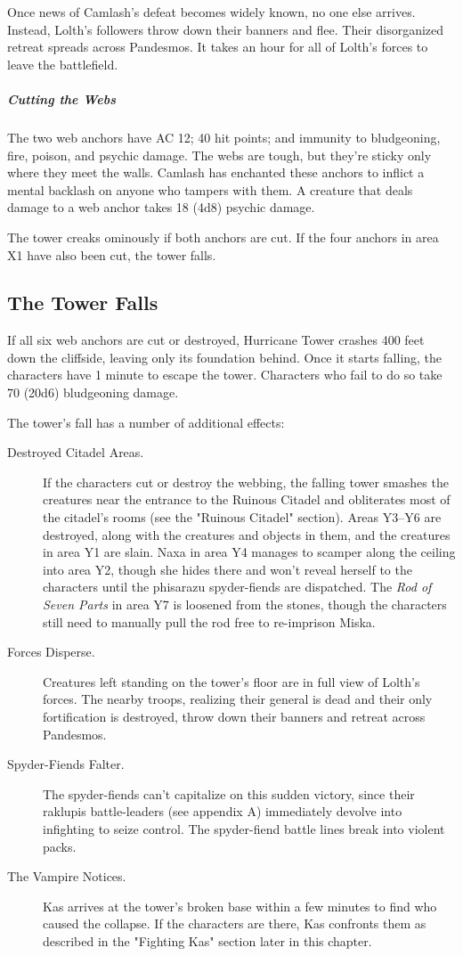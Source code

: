 \documentclass[10pt,a4paper,twoside,bg=print,twocolumn,openany,nodeprecatedcode]{dndbook}
\begin{document}
Once news of Camlash's defeat becomes widely known, no one else arrives. Instead, Lolth's followers throw down their banners and flee. Their disorganized retreat spreads across Pandesmos. It takes an hour for all of Lolth's forces to leave the battlefield.

\subparagraph{Cutting the Webs}
The two web anchors have AC 12; 40 hit points; and immunity to bludgeoning, fire, poison, and psychic damage. The webs are tough, but they're sticky only where they meet the walls. Camlash has enchanted these anchors to inflict a mental backlash on anyone who tampers with them. A creature that deals damage to a web anchor takes 18 (4d8) psychic damage.

The tower creaks ominously if both anchors are cut. If the four anchors in area X1 have also been cut, the tower falls.

\subsection{The Tower Falls}
If all six web anchors are cut or destroyed, Hurricane Tower crashes 400 feet down the cliffside, leaving only its foundation behind. Once it starts falling, the characters have 1 minute to escape the tower. Characters who fail to do so take 70 (20d6) bludgeoning damage.

The tower's fall has a number of additional effects:


\begin{description}
\item[Destroyed Citadel Areas.]
If the characters cut or destroy the webbing, the falling tower smashes the creatures near the entrance to the Ruinous Citadel and obliterates most of the citadel's rooms (see the "Ruinous Citadel" section). Areas Y3–Y6 are destroyed, along with the creatures and objects in them, and the creatures in area Y1 are slain. Naxa in area Y4 manages to scamper along the ceiling into area Y2, though she hides there and won't reveal herself to the characters until the phisarazu spyder-fiends are dispatched. The \textit{Rod of Seven Parts} in area Y7 is loosened from the stones, though the characters still need to manually pull the rod free to re-imprison Miska.
\item[Forces Disperse.]
Creatures left standing on the tower's floor are in full view of Lolth's forces. The nearby troops, realizing their general is dead and their only fortification is destroyed, throw down their banners and retreat across Pandesmos.
\item[Spyder-Fiends Falter.]
The spyder-fiends can't capitalize on this sudden victory, since their raklupis battle-leaders (see appendix A) immediately devolve into infighting to seize control. The spyder-fiend battle lines break into violent packs.
\item[The Vampire Notices.]
Kas arrives at the tower's broken base within a few minutes to find who caused the collapse. If the characters are there, Kas confronts them as described in the "Fighting Kas" section later in this chapter.
\end{description}
\end{document}
